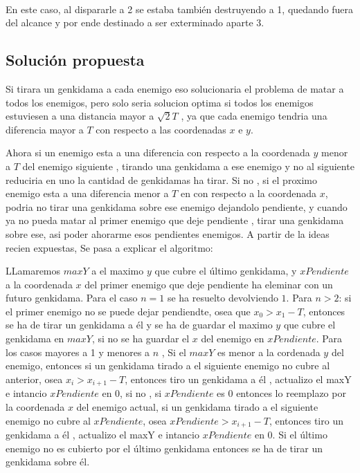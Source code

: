	~

	En este caso, al dispararle a 2 se estaba también destruyendo a 1, quedando
	fuera del alcance y por ende destinado a ser exterminado aparte 3.

    \subsection{Solución propuesta}
        Si tirara un genkidama a cada enemigo eso solucionaria el problema de matar a todos los enemigos, pero solo seria solucion optima si todos los enemigos estuviesen a una distancia mayor a $\sqrt{2}T$ , ya que cada enemigo tendria una diferencia mayor a $T$ con respecto a las coordenadas $x$ e $y$. 

        Ahora si un enemigo esta a una diferencia con respecto a la coordenada $y$ menor a $T$ del enemigo siguiente , tirando una genkidama a ese enemigo y no al siguiente reduciria en uno la cantidad de genkidamas ha tirar. Si no , si el proximo enemigo esta a una diferencia menor a $T$ en con respecto a la coordenada $x$, podria no tirar una genkidama sobre ese enemigo dejandolo pendiente, y cuando ya no pueda matar al primer enemigo que deje pendiente , tirar una genkidama sobre ese, asi poder ahorarme esos pendientes enemigos. A partir de la ideas recien expuestas, Se pasa a explicar el algoritmo:  


        LLamaremos $maxY$ a el maximo $y$ que cubre el último genkidama, y $xPendiente$ a la coordenada $x$ del primer enemigo que deje pendiente ha eleminar con un futuro genkidama.
        Para el caso $n = 1$ se ha resuelto devolviendo $1$. Para $n > 2$: si el primer enemigo no se puede dejar pendiendte, osea que $x_0 > x_1  - T$, entonces se ha de tirar un genkidama a él y se ha de guardar el maximo $y$ que cubre el genkidama en $maxY$, si no se ha guardar el $x$ del enemigo en $xPendiente$. Para los casos mayores a 1 y menores a $n$ , Si el $maxY$ es menor a la cordenada $y$ del enemigo, entonces si un genkidama tirado a el siguiente enemigo no cubre al anterior, osea $x_i > x_{i+1} - T$,  entonces tiro un genkidama a él , actualizo el maxY e intancio $xPendiente$ en $0$, si no , si $xPendiente$ es $0$ entonces lo reemplazo por la coordenada $x$ del enemigo actual, si un genkidama tirado a el siguiente enemigo no cubre al $xPendiente$, osea  $xPendiente > x_{i+1} - T$, entonces tiro un genkidama a él , actualizo el maxY e intancio $xPendiente$ en $0$. Si el último enemigo no es cubierto por el último genkidama entonces se ha de tirar un genkidama sobre él.

